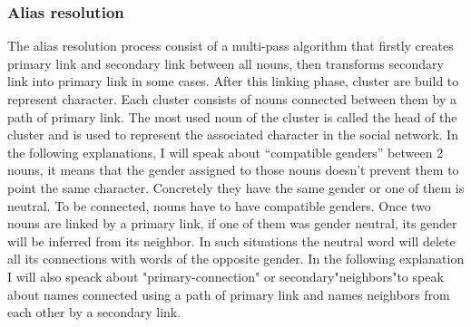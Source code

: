 \documentclass[a4paper, 12pt]{report}
\begin{document}
\subsubsection{Alias resolution}
\label{section:alias}
The alias resolution process consist of a multi-pass algorithm that firstly creates  primary link and secondary link between all  nouns, then  transforms secondary link into  primary link in some cases. After this linking phase, cluster are  build to represent character. Each cluster consists of nouns connected between them by a path of primary link. The most used noun of the cluster is called the head of the cluster and is used to represent the associated character in the social network. In the following explanations, I will speak about ``compatible genders'' between 2 nouns, it means that the gender assigned to those nouns doesn't prevent them to point the same character. Concretely they have the same gender or one of them is neutral. To be connected, nouns have to have compatible genders. Once two nouns are linked by a  primary link, if one of them was gender neutral, its gender will be inferred from its neighbor. In such situations the neutral word will delete all its connections with words of the opposite gender. In the following explanation I will also speack about "primary-connection" or secondary"neighbors"to speak about names connected using a path of primary link and names neighbors from each other by a secondary link. \\
\end{document}
